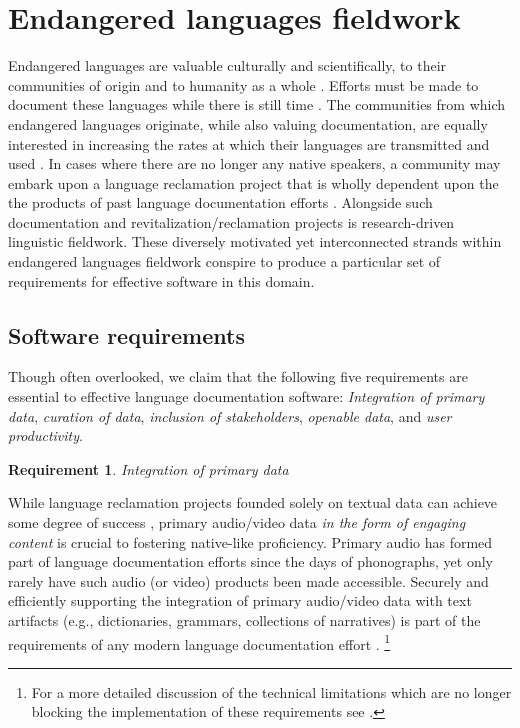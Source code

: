 \documentclass[11pt]{article}
\newtheorem{requirement}{Requirement}
\begin{document}

\section{Endangered languages fieldwork}\label{sec:fieldwork}

Endangered languages are valuable culturally and scientifically, to their
communities of origin \cite{Ironstrack:2012} and to humanity as a whole
\cite{harrison2007languages}. Efforts must be made to document these languages
while there is still time \cite{Good:2012,Thieberger:2012}. The communities
from which endangered languages originate, while also valuing documentation,
are equally interested in increasing the rates at which their languages are
transmitted and used \cite{Myaamia:2001}. In cases where there are no longer
any native speakers, a community may embark upon a language reclamation project
that is wholly dependent upon the the products of past language documentation
efforts \cite{Leonard:2012,Costa:2012}. Alongside such documentation and
revitalization/reclamation projects is research-driven linguistic fieldwork.
These diversely motivated yet interconnected strands within endangered
languages fieldwork conspire to produce a particular set of requirements for
effective software in this domain.


\subsection{Software requirements}
\label{sec:requirements}

Though often overlooked, we claim that the following five requirements are
essential to effective language documentation software: \emph{Integration of
primary data}, \emph{curation of data}, \emph{inclusion of stakeholders},
\emph{openable data}, and \emph{user productivity}.


\begin{requirement}
	\label{req:primary-data}
       Integration of primary data
\end{requirement}

While language reclamation projects founded solely on textual data can achieve
some degree of success \cite{Ironstrack:2012}, primary audio/video data \emph{in the
form of engaging content} is crucial to fostering native-like proficiency.
Primary audio has formed part of language documentation efforts since
the days of phonographs, yet only rarely have such audio (or video) products
been made accessible. Securely and efficiently supporting the integration of
primary audio/video data with text artifacts (e.g., dictionaries, grammars,
collections of narratives) is part of the requirements of any modern language
documentation effort \cite{Schroeter:2006,Good:2012b}.%
\footnote{For a more detailed discussion of the technical limitations which are
    no longer blocking the implementation of these requirements see
\cite{lingsync:2012}.}
\end{document}
